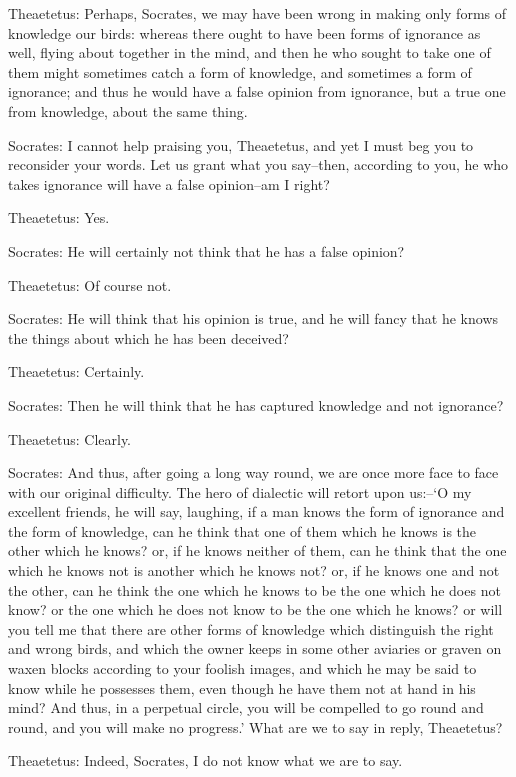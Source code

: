 Theaetetus: Perhaps, Socrates, we may have been wrong in making only
forms of knowledge our birds: whereas there ought to have been forms of
ignorance as well, flying about together in the mind, and then he who
sought to take one of them might sometimes catch a form of knowledge,
and sometimes a form of ignorance; and thus he would have a false
opinion from ignorance, but a true one from knowledge, about the same
thing.

Socrates: I cannot help praising you, Theaetetus, and yet I must beg you
to reconsider your words. Let us grant what you say--then, according to
you, he who takes ignorance will have a false opinion--am I right?

Theaetetus: Yes.

Socrates: He will certainly not think that he has a false opinion?

Theaetetus: Of course not.

Socrates: He will think that his opinion is true, and he will fancy that
he knows the things about which he has been deceived?

Theaetetus: Certainly.

Socrates: Then he will think that he has captured knowledge and not
ignorance?

Theaetetus: Clearly.

Socrates: And thus, after going a long way round, we are once more face
to face with our original difficulty. The hero of dialectic will retort
upon us:--`O my excellent friends, he will say, laughing, if a man knows
the form of ignorance and the form of knowledge, can he think that one
of them which he knows is the other which he knows? or, if he knows
neither of them, can he think that the one which he knows not is another
which he knows not? or, if he knows one and not the other, can he think
the one which he knows to be the one which he does not know? or the one
which he does not know to be the one which he knows? or will you tell me
that there are other forms of knowledge which distinguish the right and
wrong birds, and which the owner keeps in some other aviaries or graven
on waxen blocks according to your foolish images, and which he may be
said to know while he possesses them, even though he have them not at
hand in his mind? And thus, in a perpetual circle, you will be compelled
to go round and round, and you will make no progress.' What are we to
say in reply, Theaetetus?

Theaetetus: Indeed, Socrates, I do not know what we are to say.


